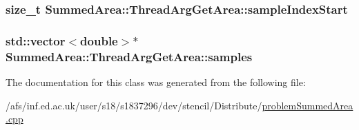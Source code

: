 \hypertarget{classSummedArea_1_1ThreadArgGetArea_af67fa94677c2947d70ba11a42b923d36}{
\subsubsection[{sample\-Index\-Start}]{\setlength{\rightskip}{0pt plus 5cm}size\-\_\-t Summed\-Area\-::\-Thread\-Arg\-Get\-Area\-::sample\-Index\-Start}}\label{classSummedArea_1_1ThreadArgGetArea_af67fa94677c2947d70ba11a42b923d36}
\hypertarget{classSummedArea_1_1ThreadArgGetArea_ad37fc357e9602189579bfe9e352d4041}{
\subsubsection[{samples}]{\setlength{\rightskip}{0pt plus 5cm}std\-::vector$<$double$>$$\ast$ Summed\-Area\-::\-Thread\-Arg\-Get\-Area\-::samples}}\label{classSummedArea_1_1ThreadArgGetArea_ad37fc357e9602189579bfe9e352d4041}


The documentation for this class was generated from the following file\-:\begin{DoxyCompactItemize}
\item 
/afs/inf.\-ed.\-ac.\-uk/user/s18/s1837296/dev/stencil/\-Distribute/\hyperlink{problemSummedArea_8cpp}{problem\-Summed\-Area.\-cpp}\end{DoxyCompactItemize}
